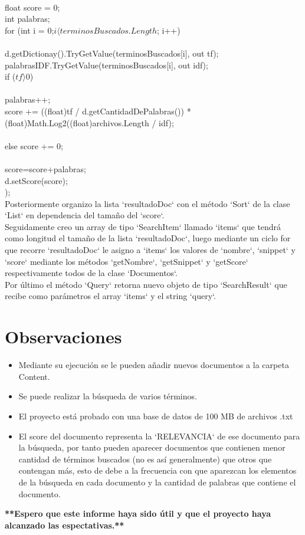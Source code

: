 \documentclass{article}
\begin{document}
{\\
float score = 0;\\
int palabras;\\
for (int i = 0;$ i  \langle   terminosBuscados.Length$; i++)\\
{\\
d.getDictionay().TryGetValue(terminosBuscados[i], out tf);\\
palabrasIDF.TryGetValue(terminosBuscados[i], out idf);\\
if ($tf \rangle  0$)\\
{\\
palabras++;\\
score += ((float)tf / d.getCantidadDePalabras()) * (float)Math.Log2((float)archivos.Length / idf);\\
}\\
else score += 0;\\
}\\
score=score+palabras;\\
d.setScore(score);\\
});\\

Posteriormente organizo la lista `resultadoDoc` con el método `Sort` de la clase `List` 
en dependencia del tamaño del `score`.\\
Seguidamente creo un array de tipo `SearchItem` llamado `items` que tendrá como longitud 
el tamaño de la lista `resultadoDoc`, luego mediante un ciclo for que recorre `resultadoDoc` 
le asigno a `items` los valores de `nombre`, `snippet` y `score` mediante los métodos `getNombre`,
`getSnippet` y `getScore` respectivamente todos de la clase `Documentos`.\\
Por último el método `Query` retorna nuevo objeto de tipo `SearchResult` que recibe como parámetros
el array `items` y el string `query`.\\

\section{Observaciones}
\begin{itemize}
  \item Mediante su ejecución se le pueden añadir nuevos documentos a la carpeta Content.
  \item Se puede realizar la búsqueda de varios términos.
  \item El proyecto está probado con una base de datos de 100 MB de archivos .txt
  \item El score del documento representa la `RELEVANCIA` de ese documento para la búsqueda,
   por tanto pueden aparecer documentos que contienen menor cantidad de términos buscados 
   (no es así generalmente) que otros que contengan más, esto de debe a la frecuencia con
    que aparezcan los elementos de la búsqueda en cada documento y la cantidad de palabras
     que contiene el documento.
\end{itemize}

\textbf{**Espero que este informe haya sido útil y que el proyecto haya alcanzado las espectativas.**}
\end{document}
